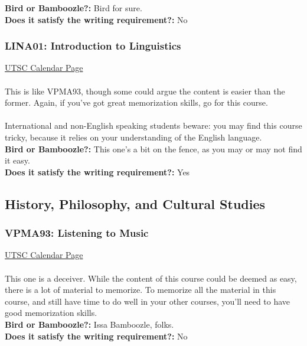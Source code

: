 \documentclass[11pt]{article}
\begin{document}
\textbf{Bird or Bamboozle?:} Bird for sure.\\

\textbf{Does it satisfy the writing requirement?:} No

\subsubsection{LINA01: Introduction to Linguistics}

\href{https://utsc.calendar.utoronto.ca/course/LINA01H3}{UTSC Calendar Page}\\\\
This is like VPMA93, though some could argue the content is easier than the former.  Again, if you've got great memorization skills, go for this course. \\ \\ International and non-English speaking students beware: you may find this course tricky, because it relies on your understanding of the English language. \\

\textbf{Bird or Bamboozle?:} This one's a bit on the fence, as you may or may not find it easy.\\

\textbf{Does it satisfy the writing requirement?:} Yes

\subsection{History, Philosophy, and Cultural Studies}
\subsubsection{VPMA93: Listening to Music}

\href{https://utsc.calendar.utoronto.ca/course/VPMA93H3}{UTSC Calendar Page}\\\\
This one is a deceiver.  While the content of this course could be deemed as easy, there is a lot of material to memorize.  To memorize all the material in this course, and still have time to do well in your other courses, you'll need to have good memorization skills.\\

\textbf{Bird or Bamboozle?:} Issa Bamboozle, folks.\\

\textbf{Does it satisfy the writing requirement?:} No
\end{document}
